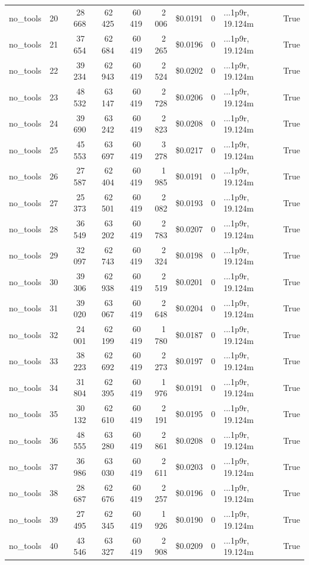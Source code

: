 \documentclass[a4paper,11pt]{article}
\begin{document}
\begin{table}[H]
{\begin{tabular}{l r r r r r r r l r}
no\_tools & 20 & 28\,668 & 62\,425 & 60\,419 & 2\,006 & \$0.0191 & 0 & ...1p9r, 19.124m & True \\
no\_tools & 21 & 37\,654 & 62\,684 & 60\,419 & 2\,265 & \$0.0196 & 0 & ...1p9r, 19.124m & True \\
no\_tools & 22 & 39\,234 & 62\,943 & 60\,419 & 2\,524 & \$0.0202 & 0 & ...1p9r, 19.124m & True \\
no\_tools & 23 & 48\,532 & 63\,147 & 60\,419 & 2\,728 & \$0.0206 & 0 & ...1p9r, 19.124m & True \\
no\_tools & 24 & 39\,690 & 63\,242 & 60\,419 & 2\,823 & \$0.0208 & 0 & ...1p9r, 19.124m & True \\
no\_tools & 25 & 45\,553 & 63\,697 & 60\,419 & 3\,278 & \$0.0217 & 0 & ...1p9r, 19.124m & True \\
no\_tools & 26 & 27\,587 & 62\,404 & 60\,419 & 1\,985 & \$0.0191 & 0 & ...1p9r, 19.124m & True \\
no\_tools & 27 & 25\,373 & 62\,501 & 60\,419 & 2\,082 & \$0.0193 & 0 & ...1p9r, 19.124m & True \\
no\_tools & 28 & 36\,549 & 63\,202 & 60\,419 & 2\,783 & \$0.0207 & 0 & ...1p9r, 19.124m & True \\
no\_tools & 29 & 32\,097 & 62\,743 & 60\,419 & 2\,324 & \$0.0198 & 0 & ...1p9r, 19.124m & True \\
no\_tools & 30 & 39\,306 & 62\,938 & 60\,419 & 2\,519 & \$0.0201 & 0 & ...1p9r, 19.124m & True \\
no\_tools & 31 & 39\,020 & 63\,067 & 60\,419 & 2\,648 & \$0.0204 & 0 & ...1p9r, 19.124m & True \\
no\_tools & 32 & 24\,001 & 62\,199 & 60\,419 & 1\,780 & \$0.0187 & 0 & ...1p9r, 19.124m & True \\
no\_tools & 33 & 38\,223 & 62\,692 & 60\,419 & 2\,273 & \$0.0197 & 0 & ...1p9r, 19.124m & True \\
no\_tools & 34 & 31\,804 & 62\,395 & 60\,419 & 1\,976 & \$0.0191 & 0 & ...1p9r, 19.124m & True \\
no\_tools & 35 & 30\,132 & 62\,610 & 60\,419 & 2\,191 & \$0.0195 & 0 & ...1p9r, 19.124m & True \\
no\_tools & 36 & 48\,555 & 63\,280 & 60\,419 & 2\,861 & \$0.0208 & 0 & ...1p9r, 19.124m & True \\
no\_tools & 37 & 36\,986 & 63\,030 & 60\,419 & 2\,611 & \$0.0203 & 0 & ...1p9r, 19.124m & True \\
no\_tools & 38 & 28\,687 & 62\,676 & 60\,419 & 2\,257 & \$0.0196 & 0 & ...1p9r, 19.124m & True \\
no\_tools & 39 & 27\,495 & 62\,345 & 60\,419 & 1\,926 & \$0.0190 & 0 & ...1p9r, 19.124m & True \\
no\_tools & 40 & 43\,546 & 63\,327 & 60\,419 & 2\,908 & \$0.0209 & 0 & ...1p9r, 19.124m & True \\
\bottomrule
\end{tabular}}
\end{table}
\end{document}
